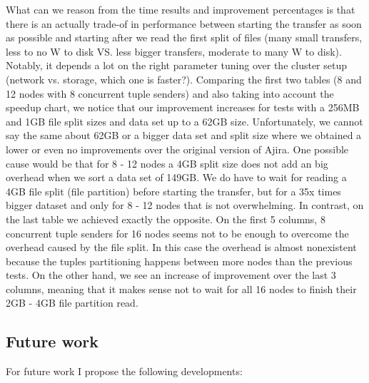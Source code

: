 What can we reason from the time results and improvement percentages is that there is an actually trade-of in performance between starting the transfer as soon as possible and starting after we read the first split of files (many small transfers, less to no W to disk VS. less bigger transfers, moderate to many W to disk). Notably, it depends a lot on the right parameter tuning over the cluster setup (network vs. storage, which one is faster?). Comparing the first two tables (8 and 12 nodes with 8 concurrent tuple senders) and also taking into account the speedup chart, we notice that our improvement increases for  tests with a 256MB and 1GB file split sizes and data set up to a 62GB size. Unfortunately, we cannot say the same about 62GB or a bigger data set and split size where we obtained a lower or even no improvements over the original version of Ajira. One possible cause would be that for 8 - 12 nodes a 4GB split size does not add an big overhead when we sort a data set of 149GB. We do have to wait for reading a 4GB file split (file partition) before starting the transfer, but for a 35x times bigger dataset and only for 8 - 12 nodes that is not overwhelming. In contrast, on the last table we achieved exactly the opposite. On the first 5 columns, 8 concurrent tuple senders for 16 nodes seems not to be enough to overcome the overhead caused by the file split. In this case the overhead is almost nonexistent because the tuples partitioning happens between more nodes than the previous tests. On the other hand, we see an increase of improvement over the last 3 columns, meaning that it makes sense not to wait for all 16 nodes to finish their 2GB - 4GB file partition read. 

\subsection{Future work}

For future work I propose the following developments:

